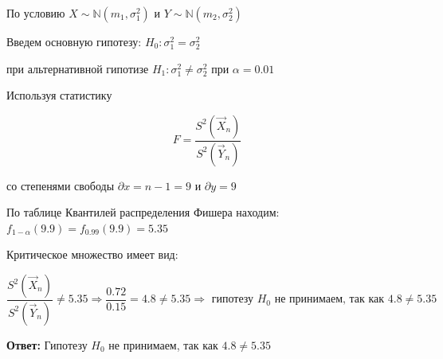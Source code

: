 \documentclass[12pt, a4paper]{report}
\begin{document}
	\vspace{0.3cm}По условию $X \sim  \mathbb{N}(m_1, \sigma^2_1)$ и $Y \sim  \mathbb{N}(m_2, \sigma^2_2)$
	
	\vspace{0.3cm}Введем основную гипотезу: $H_0: \sigma^2_1 = \sigma^2_2$
	
	\vspace{0.3cm}при альтернативной гипотизе $H_1: \sigma^2_1 \neq \sigma^2_2$ при $\alpha = 0.01$
	
	\vspace{0.3cm}Используя статистику
	
	\begin{equation*}
	F = \frac{S^2(\vec{X}_n)}{S^2(\vec{Y}_n)}
	\end{equation*}
	
	\vspace{0.3cm}со степенями свободы $\partial x = n - 1 = 9$ и $\partial y =  9$
	
	\vspace{0.3cm}  По таблице Квантилей распределения Фишера находим: $f_{1-\alpha}(9.9) = f_{0.99}(9.9) = 5.35$
	
	\vspace{0.3cm} Критическое множество имеет вид:
	
	\begin{equation*}
	\frac{S^2(\vec{X}_n)}{S^2(\vec{Y}_n)} \neq 5.35 \Rightarrow \frac{0.72}{0.15} = 4.8 \neq 5.35 \Rightarrow \text{ гипотезу } H_0 \text{ не принимаем, так как } 4.8 \neq 5.35
	\end{equation*}
	
	
	
	\vspace{0.5cm}
	\textbf{Ответ:}
	Гипотезу $H_0$ не принимаем, так как $4.8 \neq 5.35$
	
	\newpage
	
\end{document}

